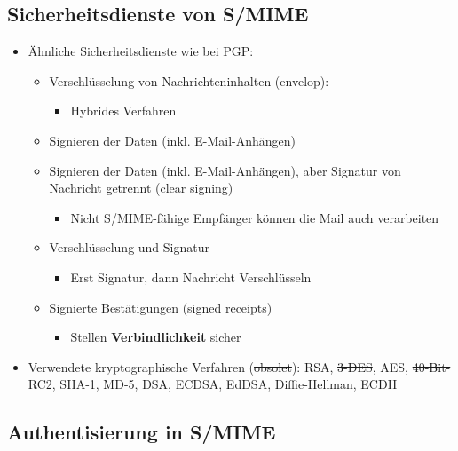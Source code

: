 \documentclass[openany]{book}
\begin{document}
\subsection{Sicherheitsdienste von S/MIME}

\begin{itemize}
    \item Ähnliche Sicherheitsdienste wie bei PGP:
    \begin{itemize}
        \item Verschlüsselung von Nachrichteninhalten (envelop):
        \begin{itemize}
            \item Hybrides Verfahren
        \end{itemize}
        \item Signieren der Daten (inkl. E-Mail-Anhängen)
        \item Signieren der Daten (inkl. E-Mail-Anhängen), aber Signatur von Nachricht getrennt (clear signing)
        \begin{itemize}
            \item Nicht S/MIME-fähige Empfänger können die Mail auch verarbeiten
        \end{itemize}
        \item Verschlüsselung und Signatur
        \begin{itemize}
            \item Erst Signatur, dann Nachricht Verschlüsseln
        \end{itemize}
        \item Signierte Bestätigungen (signed receipts)
        \begin{itemize}
            \item Stellen \textbf{Verbindlichkeit} sicher
        \end{itemize}
    \end{itemize}
    \item Verwendete kryptographische Verfahren (\sout{obsolet}): RSA, \sout{3-DES}, AES, \sout{40-Bit-RC2, SHA-1, MD-5}, DSA, ECDSA, EdDSA, Diffie-Hellman, ECDH
\end{itemize}

\subsection{Authentisierung in S/MIME}
\end{document}
